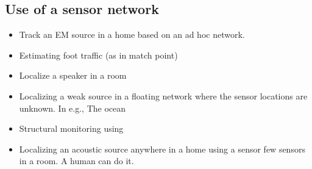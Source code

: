 \documentclass{article}
\begin{document}
\subsection{Use of a sensor network}
\begin{itemize}
\item Track an EM source in a home based on an ad hoc network. 
\item Estimating foot traffic (as in match point)
\item Localize a speaker in a room
\item Localizing a weak source in a floating network where the sensor locations are unknown. In e.g., The ocean
\item Structural monitoring using 
\item Localizing an acoustic source anywhere in a home using a sensor few sensors in a room. A human can do it. 
\end{itemize}
\end{document}
